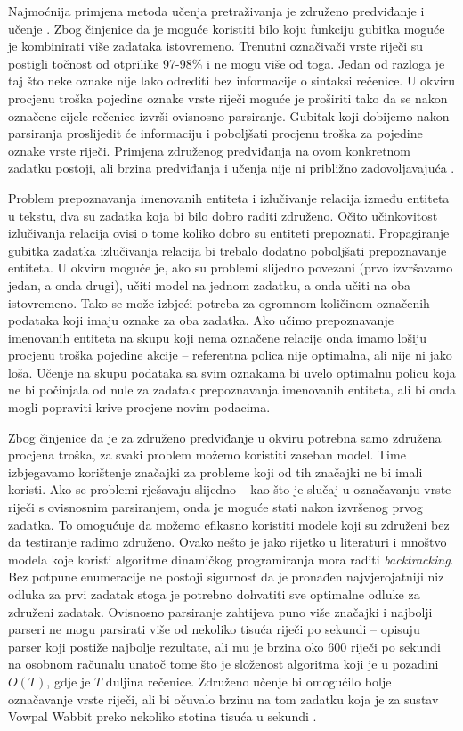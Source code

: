 Najmoćnija primjena metoda učenja pretraživanja je združeno predviđanje i učenje
. Zbog činjenice da je moguće koristiti bilo
koju funkciju gubitka moguće je kombinirati više zadataka istovremeno. Trenutni
označivači vrste riječi su postigli točnost od otprilike 97-98\%
\citep{manning2011part} i ne mogu više od toga. Jedan od razloga je taj što neke
oznake nije lako odrediti bez informacije o sintaksi rečenice. U \lts{} okviru
procjenu troška pojedine oznake vrste riječi moguće je proširiti tako da se
nakon označene cijele rečenice izvrši ovisnosno parsiranje. Gubitak koji
dobijemo nakon parsiranja proslijedit će informaciju i poboljšati procjenu
troška za pojedine oznake vrste riječi. Primjena združenog predviđanja na ovom
konkretnom zadatku postoji, ali brzina predviđanja i učenja nije ni približno
zadovoljavajuća \citep{bohnet2012transition}.

Problem prepoznavanja imenovanih entiteta i izlučivanje relacija između entiteta
u tekstu, dva su zadatka koja bi bilo dobro raditi združeno. Očito učinkovitost
izlučivanja relacija ovisi o tome koliko dobro su entiteti prepoznati.
Propagiranje gubitka zadatka izlučivanja relacija bi trebalo dodatno poboljšati
prepoznavanje entiteta. U \lts{} okviru moguće je, ako su problemi slijedno
povezani (prvo izvršavamo jedan, a onda drugi), učiti model na jednom zadatku, a
onda učiti na oba istovremeno. Tako se može izbjeći potreba za ogromnom
količinom označenih podataka koji imaju oznake za oba zadatka. Ako učimo
prepoznavanje imenovanih entiteta na skupu koji nema označene relacije onda
imamo lošiju procjenu troška pojedine akcije -- referentna polica nije
optimalna, ali nije ni jako loša. Učenje na skupu podataka sa svim oznakama bi
uvelo optimalnu policu koja ne bi počinjala od nule za zadatak prepoznavanja
imenovanih entiteta, ali bi onda mogli popraviti krive procjene novim podacima.

Zbog činjenice da je za združeno predviđanje u \lts{} okviru potrebna samo
združena procjena troška, za svaki problem možemo koristiti zaseban model. Time
izbjegavamo korištenje značajki za probleme koji od tih značajki ne bi imali
koristi. Ako se problemi rješavaju slijedno -- kao što je slučaj u označavanju
vrste riječi s ovisnosnim parsiranjem, onda je moguće stati nakon izvršenog
prvog zadatka. To omogućuje da možemo efikasno koristiti modele koji su združeni
bez da testiranje radimo združeno. Ovako nešto je jako rijetko u literaturi i
mnoštvo modela koje koristi algoritme dinamičkog programiranja mora raditi
\textit{backtracking}. Bez potpune enumeracije ne postoji sigurnost da je
pronađen najvjerojatniji niz odluka za prvi zadatak stoga je potrebno dohvatiti
sve optimalne odluke za združeni zadatak. Ovisnosno parsiranje zahtijeva puno
više značajki i najbolji parseri ne mogu parsirati više od nekoliko tisuća
riječi po sekundi -- \citet{andor2016globally} opisuju parser koji postiže
najbolje rezultate, ali mu je brzina oko 600 riječi po sekundi na osobnom
računalu unatoč tome što je složenost algoritma koji je u pozadini $O(T)$, gdje
je $T$ duljina rečenice. Združeno učenje bi omogućilo bolje označavanje vrste
riječi, ali bi očuvalo brzinu na tom zadatku koja je za sustav Vowpal Wabbit
preko nekoliko stotina tisuća u sekundi \citep{daume14lts}.
